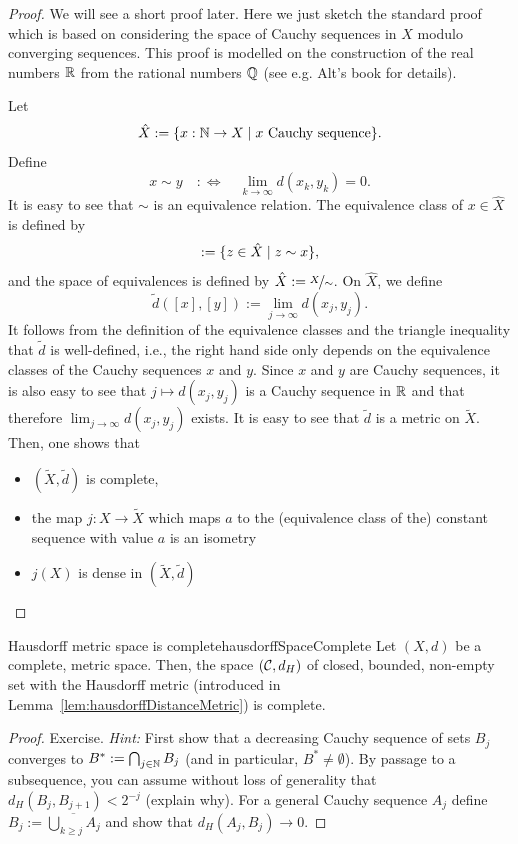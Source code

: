 \documentclass[language=english]{../../Template/TemplateLecture}
\begin{document}
\begin{proof}
    We will see a short proof later. Here we just sketch the standard proof which is based on considering the space of Cauchy sequences in $X$ modulo converging sequences. This proof is modelled on the construction of the real numbers $\mathbb{R}$ from the rational numbers $\mathbb{Q}$ (see e.g. Alt's book for details).

    Let
    \begin{equation}
        \hat{X} := \{x: \mathbb{N} \to X \mid \text{$x$ Cauchy sequence}\}.
    \end{equation}
    Define 
    \begin{equation}
        x \sim y \quad :\iff \quad \lim_{k \to \infty} d(x_k, y_k) = 0.
    \end{equation}
    It is easy to see that $\sim$ is an equivalence relation. The equivalence class of $x \in \hat{X}$ is defined by 
    \begin{equation}
        [x] := \set{z \in \hat{X} \mid z \sim x},
    \end{equation}
    and the space of equivalences is defined by $\hat{X} := \nicefrac{X}{\sim}$. On $\hat{X}$, we define 
    \begin{equation}
        \tilde{d}([x],[y]) := \lim_{j \to \infty} d(x_j, y_j).
    \end{equation}
    It follows from the definition of the equivalence classes and the triangle inequality that $\tilde{d}$ is well-defined, i.e., the right hand side only depends on the equivalence classes of the Cauchy sequences $x$ and $y$. Since $x$ and $y$ are Cauchy sequences, it is also easy to see that $j \mapsto d(x_j, y_j)$ is a Cauchy sequence in $\mathbb{R}$ and that therefore $\lim_{j \to \infty} d(x_j, y_j)$ exists. It is easy to see that $\tilde{d}$ is a metric on $\tilde{X}$. Then, one shows that
    \begin{itemize}
        \item $(\tilde{X},\tilde{d})$ is complete,
        \item the map $j: X \to \tilde{X}$ which maps $a$ to the (equivalence class of the) constant sequence with value $a$ is an isometry
        \item $j(X)$ is dense in $(\tilde{X},\tilde{d})$
    \end{itemize}
\end{proof}

\begin{lem}{Hausdorff metric space is complete}{hausdorffSpaceComplete}
    Let $(X,d)$ be a complete, metric space. Then, the space $(\mathcal{C}, d_H)$ of closed, bounded, non-empty set with the Hausdorff metric (introduced in Lemma~\ref{lem:hausdorffDistanceMetric}) is complete.
\end{lem}
\begin{proof}
    Exercise. \emph{Hint:} First show that a decreasing Cauchy sequence of sets $B_j$ converges to $B^* := \bigcap_{j \in \mathbb{N}} B_j$ (and in particular, $B^* \neq \emptyset$). By passage to a subsequence, you can assume without loss of generality that $d_H(B_j, B_{j+1}) < 2^{-j}$ (explain why). For a general Cauchy sequence $A_j$ define $B_j := \overline{\bigcup_{k \geq j} A_j}$ and show that $d_H(A_j, B_j) \to 0$.
\end{proof}
\end{document}
